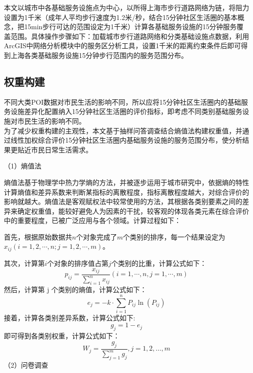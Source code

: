 \documentclass{shnuthesis}
\begin{document}
本文以城市中各基础服务设施点为中心，以所得上海市步行道路网络为链，将阻力设置为1千米（成年人平均步行速度为1.2米/秒，结合15分钟社区生活圈的基本概念，把15min步行可达的范围设定为1千米\textsuperscript{\cite{liu2020b}}）计算各基础服务设施的15分钟服务覆盖范围。具体操作步骤如下：加载城市步行道路网络和分类基础设施点数据，利用ArcGIS中网络分析模块中的服务区分析工具，设置1千米的距离约束条件后即可得到上海各类基础服务设施15分钟步行范围内的服务范围分布。

\subsection{权重构建}

不同大类POI数据对市民生活的影响不同，所以应将15分钟社区生活圈内的基础服务设施差异化配置纳入15分钟社区生活圈的评价指标，即考虑不同类别基础服务设施对市民生活的影响不同。\\
\indent 为了减少权重构建的主观性，本文基于抽样问答调查结合熵值法构建权重值，并通过线性加权综合评价15分钟社区生活圈内基础服务设施的服务范围分布，使分析结果更贴近市民日常生活需求。

（1）熵值法\textsuperscript{\cite{zhu2015a}}

熵值法基于物理学中热力学熵的方法，并被逐步运用于城市研究中，依据熵的特性计算熵值和差异系数来判断某指标的离散程度，指标离散程度越大，对综合评价的影响就越大。熵值法是客观赋权法中较常使用的方法，其根据各类别要素之间的差异来确定权重值，能较好避免人为因素的干扰，较客观的体现各类元素在综合评价中的重要程度，已被广泛应用与各个领域\textsuperscript{\cite{song2018,li2012}}。计算过程如下：

首先，根据原始数据共$n$个对象完成了$m$个类别的排序，每一个结果设定为 $x_{ij} (i=1,2,\cdots,n;j=1,2,\cdots,m)$。

其次，计算第$i$个对象的排序值占第$j$个类别的比重，计算公式如下：
\begin{equation}
	p_{i j}=\frac{x_{i j}}{\sum_{i=1}^{n} x_{i j}}(i=1, \cdots, n, j=1, \cdots, m)
\end{equation}
\newline
\indent 然后，计算第 j 个类别的熵值，计算公式如下：
\begin{equation}
	e_{j}=-k \cdot \sum_{i=1}^{n} P_{i j} \ln \left(P_{i j}\right)
\end{equation}
\newline
\indent 接着，计算各类别差异系数，计算公式如下:
\begin{equation}
	g_{j}=1-e_{j}
\end{equation}
\newline
\indent 即可得到各类别权重，计算公式如下：
\begin{equation}
	W_{j}=\frac{g_{j}}{\sum_{j=1}^{m} g_{j}}, j=1,2, \ldots, m
\end{equation}
\newline
\indent （2）问卷调查
\end{document}
